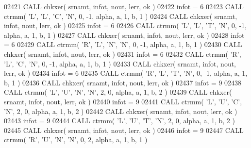 \begin{DoxyCode}
02421       \textcolor{keyword}{CALL }chkxer( srnamt, infot, nout, lerr, ok )
02422       infot = 6
02423       \textcolor{keyword}{CALL }ctrmm( \textcolor{stringliteral}{'L'}, \textcolor{stringliteral}{'L'}, \textcolor{stringliteral}{'C'}, \textcolor{stringliteral}{'N'}, 0, -1, alpha, a, 1, b, 1 )
02424       \textcolor{keyword}{CALL }chkxer( srnamt, infot, nout, lerr, ok )
02425       infot = 6
02426       \textcolor{keyword}{CALL }ctrmm( \textcolor{stringliteral}{'L'}, \textcolor{stringliteral}{'L'}, \textcolor{stringliteral}{'T'}, \textcolor{stringliteral}{'N'}, 0, -1, alpha, a, 1, b, 1 )
02427       \textcolor{keyword}{CALL }chkxer( srnamt, infot, nout, lerr, ok )
02428       infot = 6
02429       \textcolor{keyword}{CALL }ctrmm( \textcolor{stringliteral}{'R'}, \textcolor{stringliteral}{'L'}, \textcolor{stringliteral}{'N'}, \textcolor{stringliteral}{'N'}, 0, -1, alpha, a, 1, b, 1 )
02430       \textcolor{keyword}{CALL }chkxer( srnamt, infot, nout, lerr, ok )
02431       infot = 6
02432       \textcolor{keyword}{CALL }ctrmm( \textcolor{stringliteral}{'R'}, \textcolor{stringliteral}{'L'}, \textcolor{stringliteral}{'C'}, \textcolor{stringliteral}{'N'}, 0, -1, alpha, a, 1, b, 1 )
02433       \textcolor{keyword}{CALL }chkxer( srnamt, infot, nout, lerr, ok )
02434       infot = 6
02435       \textcolor{keyword}{CALL }ctrmm( \textcolor{stringliteral}{'R'}, \textcolor{stringliteral}{'L'}, \textcolor{stringliteral}{'T'}, \textcolor{stringliteral}{'N'}, 0, -1, alpha, a, 1, b, 1 )
02436       \textcolor{keyword}{CALL }chkxer( srnamt, infot, nout, lerr, ok )
02437       infot = 9
02438       \textcolor{keyword}{CALL }ctrmm( \textcolor{stringliteral}{'L'}, \textcolor{stringliteral}{'U'}, \textcolor{stringliteral}{'N'}, \textcolor{stringliteral}{'N'}, 2, 0, alpha, a, 1, b, 2 )
02439       \textcolor{keyword}{CALL }chkxer( srnamt, infot, nout, lerr, ok )
02440       infot = 9
02441       \textcolor{keyword}{CALL }ctrmm( \textcolor{stringliteral}{'L'}, \textcolor{stringliteral}{'U'}, \textcolor{stringliteral}{'C'}, \textcolor{stringliteral}{'N'}, 2, 0, alpha, a, 1, b, 2 )
02442       \textcolor{keyword}{CALL }chkxer( srnamt, infot, nout, lerr, ok )
02443       infot = 9
02444       \textcolor{keyword}{CALL }ctrmm( \textcolor{stringliteral}{'L'}, \textcolor{stringliteral}{'U'}, \textcolor{stringliteral}{'T'}, \textcolor{stringliteral}{'N'}, 2, 0, alpha, a, 1, b, 2 )
02445       \textcolor{keyword}{CALL }chkxer( srnamt, infot, nout, lerr, ok )
02446       infot = 9
02447       \textcolor{keyword}{CALL }ctrmm( \textcolor{stringliteral}{'R'}, \textcolor{stringliteral}{'U'}, \textcolor{stringliteral}{'N'}, \textcolor{stringliteral}{'N'}, 0, 2, alpha, a, 1, b, 1 )

\end{DoxyCode}
